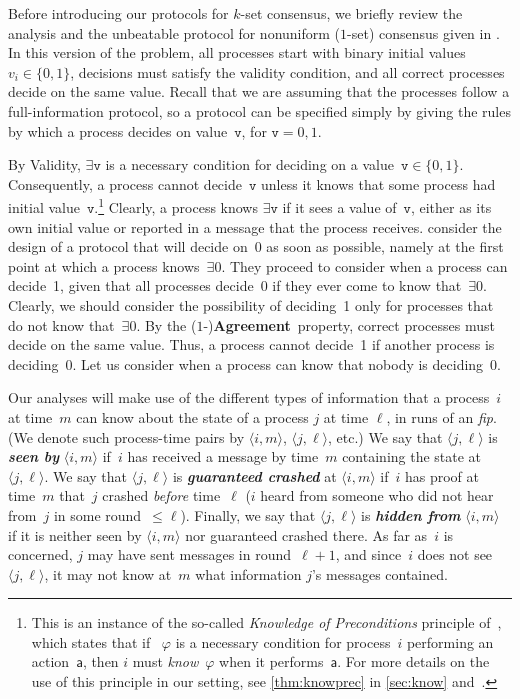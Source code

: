 \documentclass[11pt]{article}
\theoremstyle{definition}
\newcommand{\sfa}{\mathsf{a}}
\newcommand{\mv}{\mathtt{v}}
\newcommand{\existsv}{\exists{\mv}}
\newcommand{\existsZ}{\exists{0}}
\newcommand{\defemph}[1]{\textbf{\textit{#1}}}
\newcommand{\node}[1]{\langle#1\rangle}
\newcommand{\Agreement}{{\bf Agreement}}
\newcommand{\fip}{{\it fip}}
\begin{document}
Before introducing our protocols for $k$-set consensus, we briefly review the analysis and the unbeatable protocol for nonuniform ($1$-set) consensus
 given in \cite{AYY-DISC}.
In this version of the problem, all processes start with binary initial values $v_i\in\{0,1\}$,
decisions must satisfy the validity condition, and all correct processes decide on the same value. Recall that we are assuming that the processes follow a full-information protocol, so a protocol can be specified simply by giving the rules by which a process decides on value~$\mv$, for $\mv=0,1$.

By Validity, $\existsv$ is a necessary condition for deciding on a value~$\mv\in\{0,1\}$.
Consequently, a process cannot decide~$\mv$ unless it knows that some process had initial value~$\mv$.\footnote{This is an instance of the so-called {\em Knowledge of Preconditions} principle of~\cite{Moses-tark2015}, which states that if ~$\varphi$ is a necessary condition for process~$i$ performing an action~$\sfa$, then $i$ must {\em know}~$\varphi$ when it performs~$\sfa$. For more details on the use of this principle in our setting, see \cref{thm:knowprec} in \cref{sec:know}
and~\cite{AYY-DISC}.}
Clearly, a process knows $\existsv$ if it sees a value of~$\mv$, either as its own initial value or reported in a message that the process receives. \cite{AYY-DISC} consider the design of a protocol that will decide on~0 as soon as possible, namely at the first point at which
a process
 knows~$\existsZ$.
They proceed to consider when a process can decide~1, given that all processes
decide~0 if they ever come to know that~$\existsZ$. Clearly, we should consider the possibility of deciding~1 only for processes that do not know that~$\existsZ$.
By the ($1$-)\Agreement\ property, correct processes must decide on the same value.
Thus, a process cannot decide~1 if another process is deciding~0. Let us consider when a process can know that nobody is deciding~0.

Our analyses will make use of the different types of information that a process~$i$ at time~$m$ can know about the state of a process $j$ at time $\ell$, in runs of an \fip. (We denote such process-time pairs by $\node{i,m}$, $\node{j,\ell}$, etc.) We say that $\node{j,\ell}$ is \defemph{seen by} $\node{i,m}$
if~$i$ has received a message by time~$m$ containing the state at $\node{j,\ell}$. We say that $\node{j,\ell}$ is \defemph{guaranteed crashed} at $\node{i,m}$ if~$i$ has proof at time~$m$ that~$j$ crashed \emph{before} time~$\ell$ ($i$ heard from someone who did not hear from~$j$ in some round~$\le \ell$). Finally, we say that $\node{j,\ell}$ is \defemph{hidden from} $\node{i,m}$ if it is neither seen by $\node{i,m}$ nor guaranteed crashed there.
As far as~$i$ is concerned, $j$ may have sent messages in round~$\ell+1$, and since~$i$ does not see $\node{j,\ell}$, it may not know at~$m$ what information $j$'s messages contained.
\end{document}
